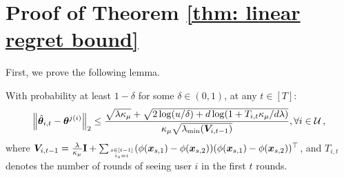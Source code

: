 \section{Proof of Theorem \ref{thm: linear regret bound}}
\label{app: proof linear}
First, we prove the following lemma.
\begin{lemma}\label{lemma:concentration:theta}
With probability at least $1-\delta$ for some $\delta\in(0,1)$, at any $t\in[T]$:
\begin{equation}
    \left\| \hat{\boldsymbol{\theta}}_{i,t}-\boldsymbol{\theta}^{j(i)} \right\|_2\leq\frac{\sqrt{\lambda \kappa_\mu}+\sqrt{2\log(u/\delta)+d\log(1+T_{i,t}\kappa_\mu/d\lambda)}}{\kappa_\mu\sqrt{\lambda_{\text{min}}(\boldsymbol{V}_{i,t-1})}}, \forall{i\in\mathcal{U}}\label{l2 norm difference bound}\,,
\end{equation}
where $\boldsymbol{V}_{i,t-1}=\frac{\lambda}{\kappa_\mu} \mathbf{I}+\sum_{s\in[t-1]\atop i_s=i}(\phi(\boldsymbol{x}_{s,1}) - \phi(\boldsymbol{x}_{s,2}))(\phi(\boldsymbol{x}_{s,1}) - \phi(\boldsymbol{x}_{s,2}))^\top$, and $T_{i,t}$ denotes the number of rounds of seeing user $i$ in the first $t$ rounds.
\end{lemma}
